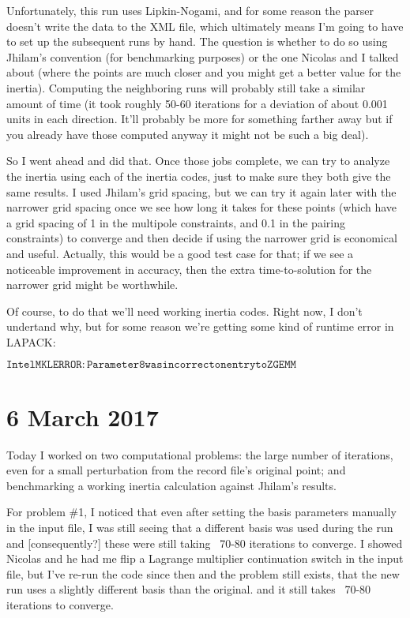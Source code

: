 \documentclass[]{report}
\begin{document}
Unfortunately, this run uses Lipkin-Nogami, and for some reason the parser doesn't write the data to the XML file, which ultimately means I'm going to have to set up the subsequent runs by hand. The question is whether to do so using Jhilam's convention (for benchmarking purposes) or the one Nicolas and I talked about (where the points are much closer and you might get a better value for the inertia). Computing the neighboring runs will probably still take a similar amount of time (it took roughly 50-60 iterations for a deviation of about 0.001 units in each direction. It'll probably be more for something farther away but if you already have those computed anyway it might not be such a big deal).

So I went ahead and did that. Once those jobs complete, we can try to analyze the inertia using each of the inertia codes, just to make sure they both give the same results. I used Jhilam's grid spacing, but we can try it again later with the narrower grid spacing once we see how long it takes for these points (which have a grid spacing of 1 in the multipole constraints, and 0.1 in the pairing constraints) to converge and then decide if using the narrower grid is economical and useful. Actually, this would be a good test case for that; if we see a noticeable improvement in accuracy, then the extra time-to-solution for the narrower grid might be worthwhile.

Of course, to do that we'll need working inertia codes. Right now, I don't undertand why, but for some reason we're getting some kind of runtime error in LAPACK:

$\mathtt{Intel MKL ERROR: Parameter 8 was incorrect on entry to ZGEMM}$

\section*{6 March 2017}
Today I worked on two computational problems: the large number of iterations, even for a small perturbation from the record file's original point; and benchmarking a working inertia calculation against Jhilam's results.

For problem \#1, I noticed that even after setting the basis parameters manually in the input file, I was still seeing that a different basis was used during the run and [consequently?] these were still taking ~70-80 iterations to converge. I showed Nicolas and he had me flip a Lagrange multiplier continuation switch in the input file, but I've re-run the code since then and the problem still exists, that the new run uses a slightly different basis than the original. and it still takes ~70-80 iterations to converge.
\end{document}
